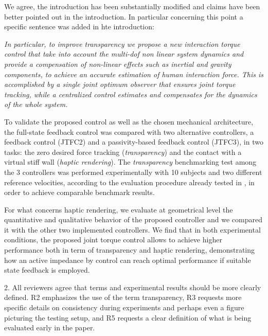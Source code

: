 

\begin{reply}
We agree, the introduction has been substantially modified and claims have been better pointed out in the introduction. In particular concerning this point a specific sentence was added in hte introduction:
	
		
		\hrulefill
		
		{\em 
			In particular, to improve transparency we propose a new interaction torque control that take into account the multi-dof non linear system dynamics and provide a compensation of non-linear effects such as inertial and gravity components, to achieve an accurate estimation of human interaction force.
			This is accomplished by a single joint optimum observer that ensures joint torque tracking, while a centralized control estimates and compensates for the dynamics of the whole system. 
			\par To validate the proposed control as well as the chosen mechanical architecture, the full-state feedback control was  compared with two alternative controllers,  a  feedback control (JTFC2) and a passivity-based feedback control (JTFC3), in two tasks: the zero desired force tracking ({\em transparency}) and the contact with a virtual stiff wall ({\em haptic rendering}). 
			The {\em transparency} benchmarking test among the 3 controllers was performed experimentally with 10 subjects and two different reference velocities, according to the evaluation procedure already tested in \cite{just2018exoskeleton}, in order to achieve comparable benchmark results.
			
			For what concerns haptic rendering, we evaluate at geometrical level the quantitative and qualitative behavior of the proposed controller and we compared it with the other two implemented controllers.
			We find  that in both experimental conditions,  the proposed joint torque control allows to achieve higher performance both in term of transparency and haptic rendering, demonstrating how an active impedance by control  can reach optimal performance if suitable state feedback is employed.
		}
			
			
			\hrulefill
	
\end{reply}


\begin{editorpoint}
	2. All reviewers agree that terms and experimental results should be
	more clearly defined. R2 emphasizes the use of the term transparency,
	R3 requests more specific details on consistency during experiments and
	perhaps even a figure picturing the testing setup, and R5 requests a
	clear definition of what is being evaluated early in the paper.
	

	
\end{editorpoint}

